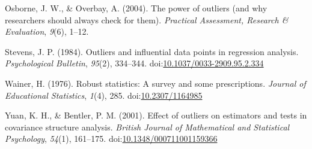 \documentclass[english,man]{apa6}
\theoremstyle{definition}
\theoremstyle{definition}
\theoremstyle{definition}
\theoremstyle{remark}
\begin{document}
\hypertarget{ref-Osborne2004}{}
Osborne, J. W., \& Overbay, A. (2004). The power of outliers (and why
researchers should always check for them). \emph{Practical Assessment,
Research \& Evaluation}, \emph{9}(6), 1--12.

\hypertarget{ref-Stevens1984}{}
Stevens, J. P. (1984). Outliers and influential data points in
regression analysis. \emph{Psychological Bulletin}, \emph{95}(2),
334--344.
doi:\href{https://doi.org/10.1037/0033-2909.95.2.334}{10.1037/0033-2909.95.2.334}

\hypertarget{ref-Wainer1976}{}
Wainer, H. (1976). Robust statistics: A survey and some prescriptions.
\emph{Journal of Educational Statistics}, \emph{1}(4), 285.
doi:\href{https://doi.org/10.2307/1164985}{10.2307/1164985}

\hypertarget{ref-Yuan2001}{}
Yuan, K. H., \& Bentler, P. M. (2001). Effect of outliers on estimators
and tests in covariance structure analysis. \emph{British Journal of
Mathematical and Statistical Psychology}, \emph{54}(1), 161--175.
doi:\href{https://doi.org/10.1348/000711001159366}{10.1348/000711001159366}
\end{document}
